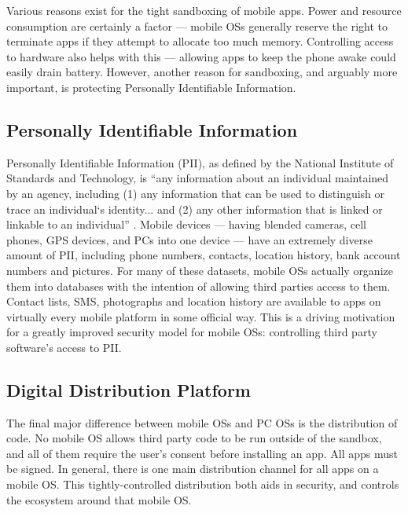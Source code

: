 Various reasons exist for the tight sandboxing of mobile apps. Power and resource consumption are certainly a factor --- mobile OSs generally reserve the right to terminate apps if they attempt to allocate too much memory. Controlling access to hardware also helps with this --- allowing apps to keep the phone awake could easily drain battery. However, another reason for sandboxing, and arguably more important, is protecting Personally Identifiable Information.

\subsection{Personally Identifiable Information}

Personally Identifiable Information (PII), as defined by the National Institute of Standards and Technology, is ``any information about an individual maintained by an agency, including (1) any information that can be used to distinguish or trace an individual‘s identity... and (2) any other information that is linked or linkable to an individual'' \citep{mccallister2010guide}. Mobile devices --- having blended cameras, cell phones, GPS devices, and PCs into one device --- have an extremely diverse amount of PII, including phone numbers, contacts, location history, bank account numbers and pictures. For many of these datasets, mobile OSs actually organize them into databases with the intention of allowing third parties access to them. Contact lists, SMS, photographs and location history are available to apps on virtually every mobile platform in some official way. This is a driving motivation for a greatly improved security model for mobile OSs: controlling third party software's access to PII. 


\subsection{Digital Distribution Platform}

The final major difference between mobile OSs and PC OSs is the distribution of code. No mobile OS allows third party code to be run outside of the sandbox, and all of them require the user's consent before installing an app. All apps must be signed. In general, there is one main distribution channel for all apps on a mobile OS. This tightly-controlled distribution both aids in security, and controls the ecosystem around that mobile OS.

